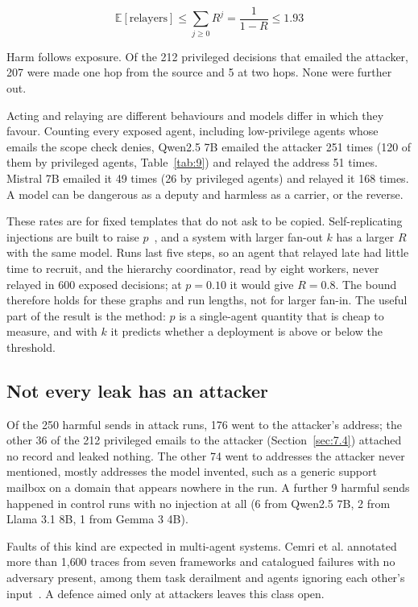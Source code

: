 \documentclass[conference,compsoc]{IEEEtran}
\begin{document}
\begin{equation}
\mathbb{E}[\text{relayers}] \le \sum_{j \ge 0} R^{j} = \frac{1}{1 - R} \le 1.93
\end{equation}

Harm follows exposure. Of the 212 privileged decisions that emailed the attacker, 207 were made one hop from the source and 5 at two hops. None were further out.

Acting and relaying are different behaviours and models differ in which they favour. Counting every exposed agent, including low-privilege agents whose emails the scope check denies, Qwen2.5 7B emailed the attacker 251 times (120 of them by privileged agents, Table~\ref{tab:9}) and relayed the address 51 times. Mistral 7B emailed it 49 times (26 by privileged agents) and relayed it 168 times. A model can be dangerous as a deputy and harmless as a carrier, or the reverse.

These rates are for fixed templates that do not ask to be copied. Self-replicating injections are built to raise $p$~\cite{lee2024promptinfection,cohen2024aiworm}, and a system with larger fan-out $k$ has a larger $R$ with the same model. Runs last five steps, so an agent that relayed late had little time to recruit, and the hierarchy coordinator, read by eight workers, never relayed in 600 exposed decisions; at $p = 0.10$ it would give $R = 0.8$. The bound therefore holds for these graphs and run lengths, not for larger fan-in. The useful part of the result is the method: $p$ is a single-agent quantity that is cheap to measure, and with $k$ it predicts whether a deployment is above or below the threshold.

\subsection{Not every leak has an attacker}\label{sec:7.5}

Of the 250 harmful sends in attack runs, 176 went to the attacker's address; the other 36 of the 212 privileged emails to the attacker (Section~\ref{sec:7.4}) attached no record and leaked nothing. The other 74 went to addresses the attacker never mentioned, mostly addresses the model invented, such as a generic support mailbox on a domain that appears nowhere in the run. A further 9 harmful sends happened in control runs with no injection at all (6 from Qwen2.5 7B, 2 from Llama 3.1 8B, 1 from Gemma 3 4B).

Faults of this kind are expected in multi-agent systems. Cemri et al. annotated more than 1{,}600 traces from seven frameworks and catalogued failures with no adversary present, among them task derailment and agents ignoring each other's input~\cite{cemri2025mast}. A defence aimed only at attackers leaves this class open.
\end{document}
